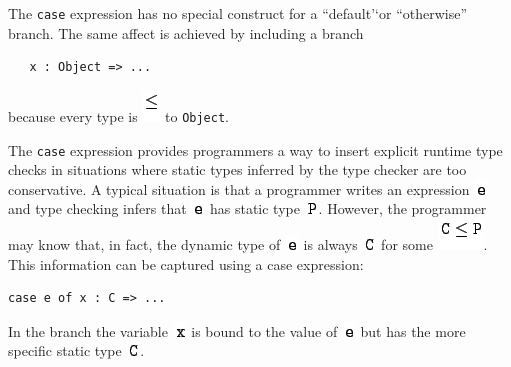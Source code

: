 \documentclass[]{article}
\begin{document}
The \texttt{case} expression has no special construct for a
``default'`or ``otherwise'' branch. The same affect is achieved by
including a branch

\begin{verbatim}
   x : Object => ...
\end{verbatim}

because every type is \includegraphics{img22.png} to \texttt{Object}.

The \texttt{case} expression provides programmers a way to insert
explicit runtime type checks in situations where static types inferred
by the type checker are too conservative. A typical situation is that a
programmer writes an expression \includegraphics{img27.png} and type
checking infers that \includegraphics{img27.png} has static type
\includegraphics{img3.png}. However, the programmer may know that, in
fact, the dynamic type of \includegraphics{img27.png} is always
\includegraphics{img28.png} for some \includegraphics{img1.png}. This
information can be captured using a case expression:

\begin{verbatim}
case e of x : C => ...
\end{verbatim}

In the branch the variable \includegraphics{img29.png} is bound to the
value of \includegraphics{img27.png} but has the more specific static
type \includegraphics{img28.png}.
\end{document}
